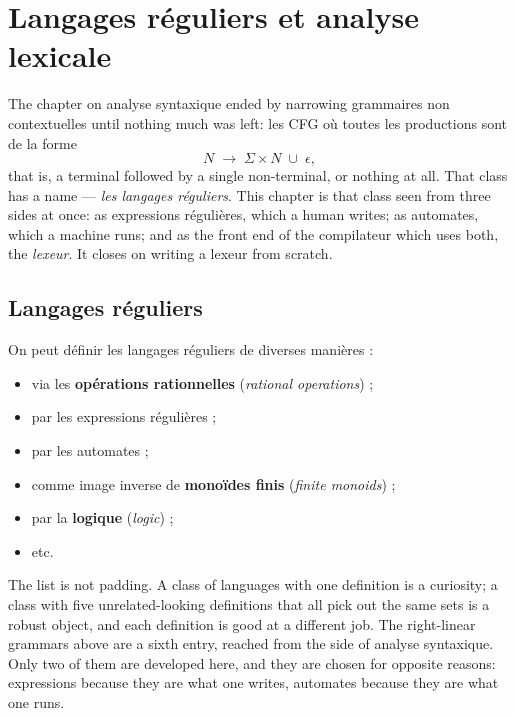 \section{Langages réguliers et analyse lexicale}
The chapter on analyse syntaxique ended by narrowing grammaires non
contextuelles until nothing much was left: les CFG où toutes les productions
sont de la forme
\[
  N \;\to\; \Sigma \times N \;\cup\; \epsilon ,
\]
that is, a terminal followed by a single non-terminal, or nothing at all. That
class has a name --- \emph{les langages réguliers}. This chapter is that class
seen from three sides at once: as expressions régulières, which a human
writes; as automates, which a machine runs; and as the front end of the
compilateur which uses both, the \textit{lexeur}. It closes on writing a lexeur
from scratch.

\subsection{Langages réguliers}
\begin{definition}
  On peut définir les langages réguliers de diverses manières :
  \begin{itemize}
    \item via les \textbf{opérations rationnelles} (\textit{rational
      operations}) ;
    \item par les expressions régulières ;
    \item par les automates ;
    \item comme image inverse de \textbf{monoïdes finis} (\textit{finite
      monoids}) ;
    \item par la \textbf{logique} (\textit{logic}) ;
    \item etc.
  \end{itemize}
\end{definition}

\begin{remark}
  The list is not padding. A class of languages with one definition is a
  curiosity; a class with five unrelated-looking definitions that all pick out
  the same sets is a robust object, and each definition is good at a different
  job. The right-linear grammars above are a sixth entry, reached from the side
  of analyse syntaxique. Only two of them are developed here, and they are
  chosen for opposite reasons: expressions because they are what one writes,
  automates because they are what one runs.
\end{remark}

